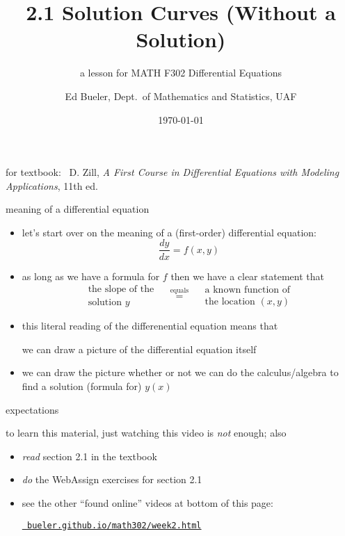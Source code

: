 \documentclass{beamer}
\title{2.1 Solution Curves (Without a Solution)}
\subtitle{a lesson for MATH F302 Differential Equations}
\author{Ed Bueler, Dept.~of Mathematics and Statistics, UAF}
\date{\tiny \today}
\begin{document}


\begin{frame}
\titlepage

\centerline{\tiny for textbook: \, D. Zill, \emph{A First Course in Differential Equations with Modeling Applications}, 11th ed.}
\end{frame}


\begin{frame}{meaning of a differential equation}

\begin{itemize}
\item let's start over on the meaning of a (first-order) differential equation:
    $$\frac{dy}{dx} = f(x,y)$$
\item as long as we have a formula for $f$ then we have a clear statement that
    $$\begin{matrix}
    \text{the slope of the} \\
    \text{solution } y 
    \end{matrix} \quad \stackrel{\text{equals}}{=} \quad
    \begin{matrix}
    \text{a known function of} \\
    \text{the location } (x,y)
    \end{matrix}$$
\item this literal reading of the differenential equation means that

\centerline{\alert{we can draw a picture of the differential equation itself}}

\item we can draw the picture whether or not we can do the calculus/algebra to find a solution (formula for) $y(x)$
\end{itemize}
\end{frame}




\begin{frame}{expectations}

to learn this material, just watching this video is \emph{not} enough; also
\begin{itemize}
\item \emph{read} section 2.1 in the textbook
\item \emph{do} the WebAssign exercises for section 2.1
\item see the other ``found online'' videos at bottom of this page:

\centerline{\href{https://bueler.github.io/math302/week2.html}{\tt \color{cyan} bueler.github.io/math302/week2.html}}
\end{itemize}
\end{frame}
\end{document}
